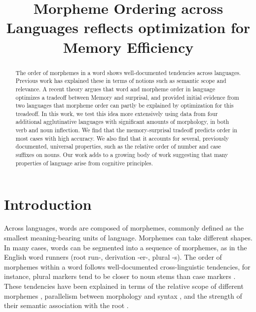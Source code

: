 \documentclass[11pt,letterpaper]{article}
\title{Morpheme Ordering across Languages reflects optimization for Memory Efficiency}
\begin{document}
\maketitle

\begin{abstract}
The order of morphemes in a word shows well-documented tendencies across languages.
Previous work has explained these in terms of notions such as semantic scope and relevance.
A recent theory argues that word and morpheme order in language optimizes a tradeoff between Memory and surprisal, and provided initial evidence from two languages that morpheme order can partly be explained by optimization for this treadeoff.
In this work, we test this idea more extensively using data from four additional agglutinative languages with significant amounts of morphology, in both verb and noun inflection.
We find that the memory-surprisal tradeoff predicts order in most cases with high accuracy.
We also find that it accounts for several, previously documented, universal properties, such as the relative order of number and case suffixes on nouns.
Our work adds to a growing body of work suggesting that many properties of language arise from cognitive principles.
\end{abstract}


\section{Introduction}

Across languages, words are composed of morphemes, commonly defined as the smallest meaning-bearing units of language.
Morphemes can take different shapes.
In many cases, words can be segmented into a sequence of morphemes, as in the English word runners (root run-, derivation -er-, plural -s).
The order of morphemes within a word follows well-documented cross-linguistic tendencies, for instance, plural markers tend to be closer to noun stems than case markers \citep[112]{greenberg1963universals}.
These tendencies have been explained in terms of the relative scope of different morphemes  \citep{rice2000morpheme}, parallelism between morphology and syntax \citep{givon1971historical,venneman1973explanation,baker1985the}, and the strength of their semantic association with the root \citep{bybee-morphology-1985}.
\end{document}
